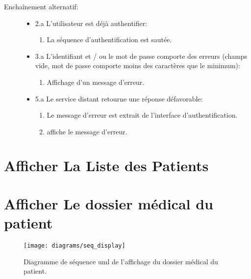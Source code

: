 \begin{description}
\begin{enumerate}
\end{enumerate}

\item [Enchaînement alternatif:]

\begin{itemize}

\item 2.a L'utilisateur est déjà authentifier:

\begin{enumerate}

\item La séquence d'authentification est sautée.

\end{enumerate}

\item 3.a L’identifiant et / ou le mot de passe comporte des erreurs (champs vide, mot de passe comporte moins des caractères que le minimum):

\begin{enumerate}

\item Affichage d'un message d'erreur.

\end{enumerate}

\item 5.a Le service distant retourne une réponse défavorable:

\begin{enumerate}

\item Le message d'erreur est extrait de l'interface d'authentification.

\item {} affiche le message d'erreur.

\end{enumerate}

\end{itemize}

\end{description}

\section{Afficher La Liste des Patients}
\section{Afficher Le dossier médical du patient}

\begin{figure}
\center
\texttt{[image: diagrams/seq\_display]}
\caption{Diagramme de séquence \gls{uml} de l'affichage du dossier médical du patient.}
\label{fig:seq_display}
\end{figure}

